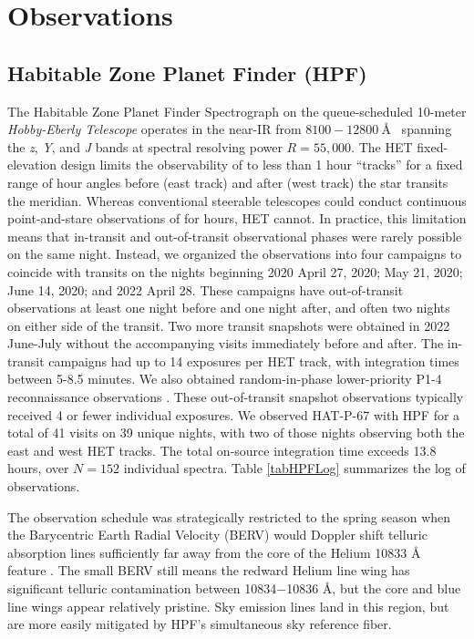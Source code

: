\documentclass[twocolumn]{aastex631}
\begin{document}
\section{Observations}\label{secObs}
\subsection{Habitable Zone Planet Finder (HPF)}

The Habitable Zone Planet Finder Spectrograph \citep[HPF;][]{2012SPIE.8446E..1SM,2014SPIE.9147E..1GM, 2019Optic...6..233M} on the queue-scheduled 10-meter \emph{Hobby-Eberly Telescope} \citep[HET;][]{1998SPIE.3352...34R} operates in the near-IR from $8100-12800~$\AA~ spanning the \textit{z}, \textit{Y}, and \textit{J} bands at spectral resolving power $R=55,000$. The HET fixed-elevation design \citep{2007PASP..119..556S} limits the observability of  to less than 1 hour ``tracks'' for a fixed range of hour angles before (east track) and after (west track) the star transits the meridian.  Whereas conventional steerable telescopes could conduct continuous point-and-stare observations of  for hours, HET cannot.  In practice, this limitation means that in-transit and out-of-transit observational phases were rarely possible on the same night.  Instead, we organized the observations into four campaigns to coincide with  transits on the nights beginning 2020 April 27, 2020; May 21, 2020; June 14, 2020; and 2022 April 28.  These campaigns have out-of-transit observations at least one night before and one night after, and often two nights on either side of the transit.  Two more transit snapshots were obtained in 2022 June-July without the accompanying visits immediately before and after.  The in-transit campaigns had up to 14 exposures per HET track, with integration times between 5-8.5 minutes.  We also obtained random-in-phase lower-priority P1-4 reconnaissance observations \citep{2007PASP..119..556S}.  These out-of-transit snapshot observations typically received 4 or fewer individual exposures.  We observed HAT-P-67 with HPF for a total of 41 visits on 39 unique nights, with two of those nights observing both the east and west HET tracks.  The total on-source integration time exceeds 13.8 hours, over $N=152$ individual spectra.  Table \ref{tabHPFLog} summarizes the log of observations.

The observation schedule was strategically restricted to the spring season when the Barycentric Earth Radial Velocity (BERV) would Doppler shift telluric absorption lines sufficiently far away from the core of the Helium 10833 \AA~ feature \citep{2022ApJ...939L..11S}.  The small BERV still means the redward Helium line wing has significant telluric contamination between 10834$-$10836 \AA, but the core and blue line wings appear relatively pristine.  Sky emission lines land in this region, but are more easily mitigated by HPF's simultaneous sky reference fiber.
\end{document}
